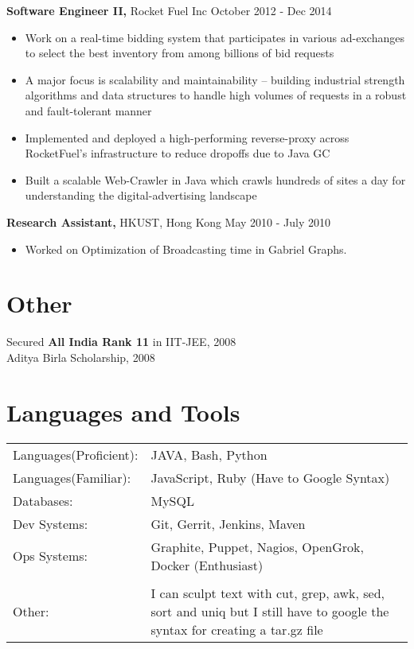 \documentclass[margin]{res}
\begin{document}
\begin{resume}
 {\bf Software Engineer II,} Rocket Fuel Inc \hfill October 2012 - Dec 2014
 \begin{itemize} \itemsep -2pt  %
 \item Work on a real-time bidding system that participates in various ad-exchanges to select the best inventory from among billions of bid requests
 \item A major focus is scalability and maintainability -- building industrial strength algorithms and data structures to handle high volumes of requests in a robust and fault-tolerant manner
 \item Implemented and deployed a high-performing reverse-proxy across RocketFuel's infrastructure to reduce dropoffs due to Java GC
 \item Built a scalable Web-Crawler in Java which crawls hundreds of sites a day for understanding the digital-advertising landscape
 \end{itemize}

 {\bf Research Assistant,} HKUST, Hong Kong \hfill May  2010  - July  2010
 \begin{itemize} \itemsep -2pt  %
 \item Worked  on  Optimization  of  Broadcasting  time  in  Gabriel  Graphs.
 \end{itemize}





\section{Other}
 Secured {\bf All India Rank 11} in IIT-JEE, 2008 \\
Aditya Birla Scholarship, 2008 \\



\section{Languages and Tools}
   \begin{tabular}{l p{3in}}
    {Languages(Proficient):} & JAVA, Bash, Python \\
    {Languages(Familiar):} &  JavaScript, Ruby (Have to Google Syntax) \\
    {Databases:} &  MySQL \\
    {Dev Systems:} &  Git, Gerrit, Jenkins, Maven \\
    {Ops Systems:} &  Graphite, Puppet, Nagios, OpenGrok, Docker (Enthusiast) \\

    {} &   \\
    {Other:} & I can sculpt text with cut, grep, awk, sed, sort and uniq but I still have to google the syntax for creating a tar.gz file \\

 \end{tabular}


\bigskip
\bigskip


\end{resume}
\end{document}
